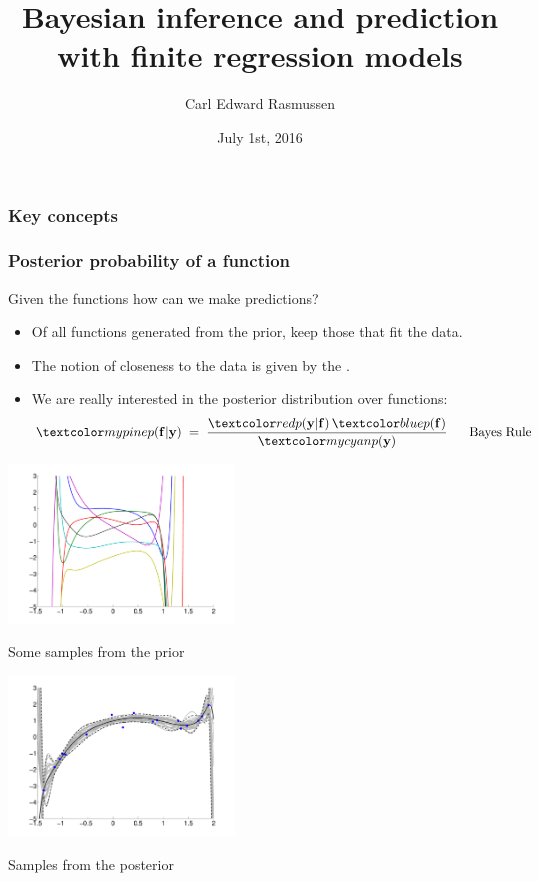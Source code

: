 

\title{Bayesian inference and prediction with finite regression models}
\author{Carl Edward Rasmussen}
\date{July 1st, 2016}



\begin{frame}
\titlepage
\end{frame}

\begin{frame}
\frametitle{Key concepts}

\end{frame}


\begin{frame}
\frametitle{Posterior probability of a function}

Given the   functions  how can we make predictions?
\begin{itemize}
\item Of all functions generated from the prior, keep those that fit the data.
\item The notion of closeness to the data is given by the .
\item We are really interested in the posterior distribution over functions:
%
\[
\Green{p(\bff|\bfy)}\;=\;\frac{\Red{p(\bfy|\bff)}\,\Blue{p(\bff)}}{\Cyan{p(\bfy)
}}
{\; \; \; \; \; \;} \mathrm{Bayes\; Rule}
\]
%
\end{itemize}

\parbox{0.45\textwidth}{
\centerline{\includegraphics[width=0.45\textwidth]{random_polynomials_degree17.pdf}}
\centerline{Some samples from the prior}
}
\parbox{0.45\textwidth}{
\centerline{\includegraphics[width=0.45\textwidth]{samples_posterior_degree17.pdf}}
\centerline{Samples from the posterior}
}
\end{frame}


